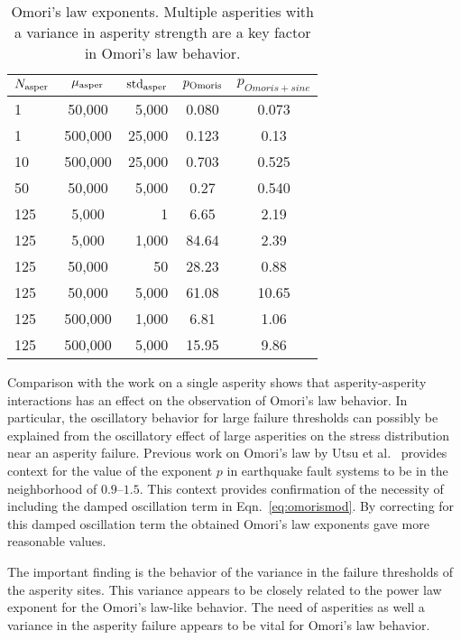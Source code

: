 \begin{table}[!ht]
\centering
	\begin{tabular}{| l || c | r | c| c|}
	\hline
	$N_{\rm asper}$    & $\mu_{\rm  asper}$ & $\mbox{std}_{\rm asper}$ & $p_{\rm Omoris}$ & $p_{Omoris+sine}$ \\
	\hline
	1  & 50,000   & 5,000 & 0.080 & 0.073 \\
	1  & 500,000   & 25,000 & 0.123 & 0.13 \\
	10  & 500,000   & 25,000 & 0.703 & 0.525 \\
	50  & 50,000   & 5,000 & 0.27 & 0.540 \\
	125  & 5,000   & 1 & 6.65 & 2.19 \\
	125  & 5,000   & 1,000 & 84.64 & 2.39 \\
	125  & 50,000   & 50 & 28.23 & 0.88 \\
	125  & 50,000   & 5,000 & 61.08 & 10.65 \\
	125  & 500,000   & 1,000 & 6.81 & 1.06 \\
	125  & 500,000   & 5,000 & 15.95 & 9.86 \\
	\hline
	\end{tabular}
  	\caption{Omori's law exponents. Multiple asperities with a variance in asperity strength are a key factor in Omori's law behavior.}
	\label{tbl:powerexp}
\end{table}  %
Comparison with the work on a single asperity shows that asperity-asperity interactions has an effect on the observation of Omori's law behavior. In particular, the oscillatory behavior for large failure thresholds can possibly be explained from the oscillatory effect of large asperities on the stress distribution near  an asperity failure. Previous work on Omori's law by Utsu et al.~\cite{utsu95}  provides context for the value of the exponent $p$ in earthquake fault systems to be in the neighborhood of $0.9$--$1.5$. This context provides confirmation of the necessity of including  the damped oscillation term in Eqn.~\eqref{eq:omorismod}. By correcting for this damped oscillation term the obtained Omori's law exponents gave more reasonable values.   


The important finding is the behavior of the variance in the failure thresholds of the asperity sites. This variance appears to be closely related to the power law exponent for the Omori's law-like behavior. The need  of asperities as well a variance in the asperity failure  appears to be vital for Omori's law behavior. 

